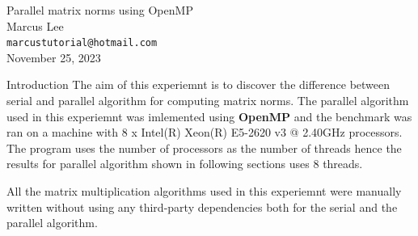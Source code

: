 \documentclass[12pt]{article}
\begin{document}
\begin{center}
    {\LARGE Parallel matrix norms using OpenMP} \\[0.6cm]

    Marcus Lee \\
    \texttt{\small marcustutorial@hotmail.com} \\[0.3cm]

    \small November 25, 2023
\end{center}

\begin{section}{Introduction}
 The aim of this experiemnt is to discover the difference between serial and parallel algorithm for computing matrix norms. The
 parallel algorithm used in this experiemnt was imlemented using \textbf{OpenMP} and the benchmark was ran on a machine with 8 x Intel(R) Xeon(R) E5-2620 v3 @ 2.40GHz processors.
 The program uses the number of processors as the number of threads hence the results for parallel algorithm shown in following sections uses 8 threads.

 All the matrix multiplication algorithms used in this experiemnt were manually written without using any third-party dependencies both for
 the serial and the parallel algorithm.
\end{section}
\end{document}
